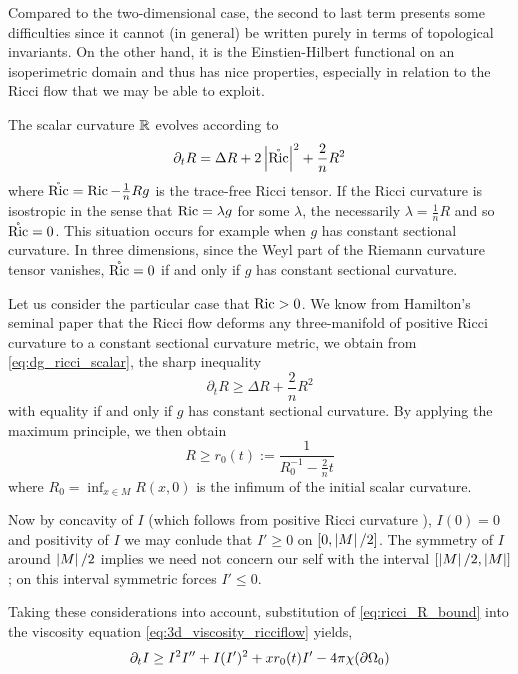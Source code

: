 \documentclass{amsart}
\begin{document}
Compared to the two-dimensional case, the second to last term presents some difficulties since it cannot (in general) be written purely in terms of topological invariants. On the other hand, it is the Einstien-Hilbert functional on an isoperimetric domain and thus has nice properties, especially in relation to the Ricci flow that we may be able to exploit.

The scalar curvature \(\mathbb{R}\) evolves according to
\begin{equation}
\label{eq:dg_ricci_scalar}
\partial_t R = \Delta R + 2\left|{\mathring{{\operatorname{Ric}}}}\right|^2 + \frac{2}{n} R^2
\end{equation}
where \(\mathring{{\operatorname{Ric}}} = \operatorname{Ric} - \tfrac{1}{n} R g\) is the trace-free Ricci tensor. If the Ricci curvature is isostropic in the sense that \(\operatorname{Ric} = \lambda g\) for some \(\lambda\), the necessarily \(\lambda = \tfrac{1}{n} R\) and so \(\mathring{{\operatorname{Ric}}} = 0\). This situation occurs for example when \(g\) has constant sectional curvature. In three dimensions, since the Weyl part of the Riemann curvature tensor vanishes, \(\mathring{{\operatorname{Ric}}} = 0\) if and only if \(g\) has constant sectional curvature.

Let us consider the particular case that \(\operatorname{Ric} > 0\). We know from Hamilton's seminal paper \cite{Hamilton:/1982} that the Ricci flow deforms any three-manifold of positive Ricci curvature to a constant sectional curvature metric, we obtain from \eqref{eq:dg_ricci_scalar}, the sharp inequality
\[
\partial_t R \geq \Delta R + \frac{2}{n} R^2
\]
with equality if and only if \(g\) has constant sectional curvature. By applying the maximum principle, we then obtain
\begin{equation}
\label{eq:ricci_R_bound}
R \geq r_0(t) := \frac{1}{R_0^{-1} - \tfrac{2}{n} t}
\end{equation}
where \(R_0 = \inf_{x\in M} R(x, 0)\) is the infimum of the initial scalar curvature.

Now by concavity of \(I\) (which follows from positive Ricci curvature \cite{MR875084}), \(I(0) = 0\) and positivity of \(I\) we may conlude that \(I' \geq 0\) on \([0, \left|{M}\right|/2]\). The symmetry of \(I\) around \(\left|{M}\right|/2\) implies we need not concern our self with the interval \([\left|{M}\right|/2, \left|{M}\right|]\); on this interval symmetric forces \(I'\leq 0\).

Taking these considerations into account, substitution of \eqref{eq:ricci_R_bound} into the viscosity equation \eqref{eq:3d_viscosity_ricciflow} yields,
\begin{equation}
\label{eq:ricci_threed_iso_ineq}
\partial_t I \geq I^2I'' + I(I')^2 + x r_0(t) I' - 4\pi\chi(\partial {\Omega_0})
\end{equation}
\end{document}
